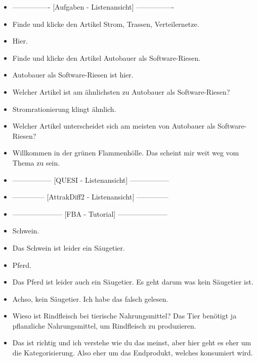 {\begin{itemize}[]
            \item {----------------} [Aufgaben - Listenansicht] {----------------}
            \item {} Finde und klicke den Artikel \flqq Strom, Trassen, Verteilernetze\frqq{}.
            \item {} Hier.
            \item {} Finde und klicke den Artikel \flqq Autobauer als Software-Riesen\frqq{}.
            \item {} \flqq Autobauer als Software-Riesen\frqq{} ist hier.
            \item {} Welcher Artikel ist am ähnlichsten zu \flqq Autobauer als Software-Riesen\frqq{}?
            \item {} \flqq Stromrationierung\frqq{} klingt ähnlich.
            \item {} Welcher Artikel unterscheidet sich am meisten von \flqq Autobauer als Software-Riesen\frqq{}?
            \item {} \flqq Willkommen in der grünen Flammenhölle\frqq{}. Das scheint mir weit weg vom Thema zu sein.
            \item {-----------------} [QUESI - Listenansicht] {-----------------}
            \item {--------------} [AttrakDiff2 - Listenansicht] {--------------}
            \item {---------------------} [FBA - Tutorial] {---------------------}
            \item {} Schwein.
            \item {} Das Schwein ist leider ein Säugetier.
            \item {} Pferd.
            \item {} Das Pferd ist leider auch ein Säugetier. Es geht darum was kein Säugetier ist.
            \item {} Achso, kein Säugetier. Ich habe das falsch gelesen.
            \item {} Wieso ist Rindfleisch bei tierische Nahrungsmittel?
                  Das Tier benötigt ja pflanzliche Nahrungsmittel, um Rindfleisch zu produzieren.
            \item {} Das ist richtig und ich verstehe wie du das meinst, aber hier geht es eher um die Kategorisierung.
                  Also eher um das Endprodukt, welches konsumiert wird.

\end{itemize}}
